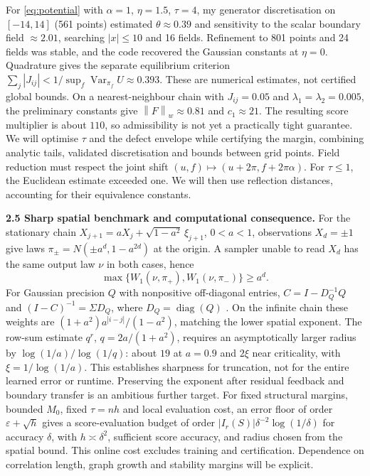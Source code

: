 \documentclass[12pt,a4paper]{article}
\newcommand{\W}{W_1}
\newcommand{\normw}[1]{\left\|#1\right\|_w}
\begin{document}
For \eqref{eq:potential} with $\alpha=1$, $\eta=1.5$, $\tau=4$, my generator discretisation on $[-14,14]$ (561 points) estimated $\theta\approx0.39$ and sensitivity to the scalar boundary field $\approx2.01$, searching $|x|\leq10$ and 16 fields. Refinement to 801 points and 24 fields was stable, and the code recovered the Gaussian constants at $\eta=0$. Quadrature gives the separate equilibrium criterion $\sum_j|J_{ij}|<1/\sup_f\operatorname{Var}_{\pi_f}U\approx0.393$. These are numerical estimates, not certified global bounds.
On a nearest-neighbour chain with $J_{ij}=0.05$ and $\lambda_1=\lambda_2=0.005$, the preliminary constants give $\normw{F}\approx0.81$ and $c_1\approx21$. The resulting score multiplier is about $110$, so admissibility is not yet a practically tight guarantee. We will optimise $\tau$ and the defect envelope while certifying the margin, combining analytic tails, validated discretisation and bounds between grid points. Field reduction must respect the joint shift $(u,f)\mapsto(u+2\pi,f+2\pi\alpha)$. For $\tau\leq1$, the Euclidean estimate exceeded one. We will then use reflection distances, accounting for their equivalence constants.

\textbf{2.5 Sharp spatial benchmark and computational consequence.}
For the stationary chain $X_{j+1}=aX_j+\sqrt{1-a^2}\,\xi_{j+1}$, $0<a<1$, observations $X_d=\pm1$ give laws $\pi_\pm=N(\pm a^d,1-a^{2d})$ at the origin. A sampler unable to read $X_d$ has the same output law $\nu$ in both cases, hence
\[
 \max\{\W(\nu,\pi_+),\W(\nu,\pi_-)\}\geq a^d.
\]
For Gaussian precision $Q$ with nonpositive off-diagonal entries, $C=I-D_Q^{-1}Q$ and $(I-C)^{-1}=\Sigma D_Q$, where $D_Q=\operatorname{diag}(Q)$ \cite{MJW06}. On the infinite chain these weights are $(1+a^2)a^{|i-j|}/(1-a^2)$, matching the lower spatial exponent. The row-sum estimate $q^r$, $q=2a/(1+a^2)$, requires an asymptotically larger radius by $\log(1/a)/\log(1/q)$: about $19$ at $a=0.9$ and $2\xi$ near criticality, with $\xi=1/\log(1/a)$. This establishes sharpness for truncation, not for the entire learned error or runtime. Preserving the exponent after residual feedback and boundary transfer is an ambitious further target.
For fixed structural margins, bounded $M_0$, fixed $\tau=nh$ and local evaluation cost, an error floor of order $\varepsilon+\sqrt h$ gives a score-evaluation budget of order $|I_r(S)|\delta^{-2}\log(1/\delta)$ for accuracy $\delta$, with $h\asymp\delta^2$, sufficient score accuracy, and radius chosen from the spatial bound. This online cost excludes training and certification. Dependence on correlation length, graph growth and stability margins will be explicit.
\end{document}

